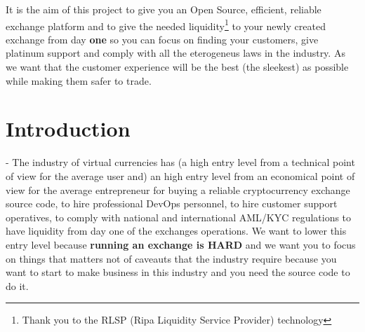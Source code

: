 \documentclass[11pt,fleqn,oneside]{book} %
\begin{document}
It is the aim of this project to give you an Open Source, efficient, reliable exchange platform and to
give the needed liquidity\footnote{Thank you to the RLSP (Ripa Liquidity Service Provider) technology} to your newly created 
exchange from day \textbf{one} so you can focus on finding your customers, give platinum support and comply with all the eterogeneus 
laws in the industry. As we want that the customer experience will be the best (the sleekest) as possible while making them safer to trade.\\
\usechapterimagetrue



\renewcommand*\contentsname{Table of Contents}
\tableofcontents %









\chapter{Introduction}
- The industry of virtual currencies has (a high entry level from a technical point of view for the average user
and) an high entry level from an economical point of view for the average entrepreneur for buying a reliable cryptocurrency 
exchange source code, to hire professional DevOps personnel, to hire customer support operatives, to comply with national and 
international AML/KYC regulations to have liquidity from day one of the exchanges operations. We want to lower this entry level because
\textbf{running an exchange is HARD} and we want you to focus on things that matters not of caveauts that the industry require because
you want to start to make business in this industry and you need the source code to do it.
\end{document}
